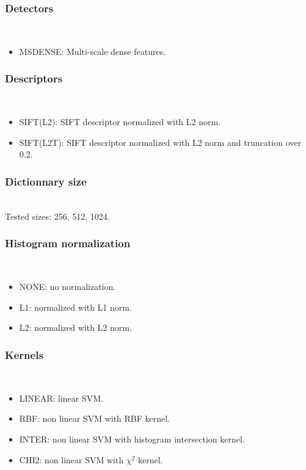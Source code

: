 \documentclass[10pt,a4paper]{llncs}
\begin{document}
\subsubsection{Detectors}$~$\\
\begin{itemize}
\item MSDENSE: Multi-scale dense features.
\end{itemize}

\subsubsection{Descriptors}$~$\\
\begin{itemize}
\item SIFT(L2): SIFT descriptor normalized with L2 norm.
\item SIFT(L2T): SIFT descriptor normalized with L2 norm and truncation over 0.2.
\end{itemize}

\subsubsection{Dictionnary size}$~$\\
Tested sizes: 256, 512, 1024.

\subsubsection{Histogram normalization}$~$\\
\begin{itemize}
\item NONE: no normalization.
\item L1: normalized with L1 norm.
\item L2: normalized with L2 norm.
\end{itemize}

\subsubsection{Kernels}$~$\\
\begin{itemize}
\item LINEAR: linear SVM.
\item RBF: non linear SVM with RBF kernel.
\item INTER: non linear SVM with histogram intersection kernel.
\item CHI2: non linear SVM with $\chi^2$ kernel.
\end{itemize}
\end{document}
